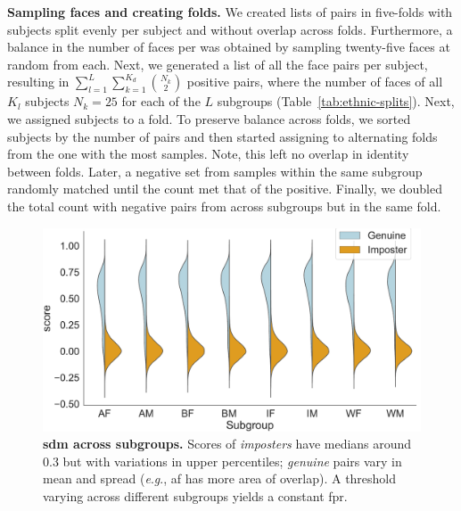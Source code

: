 \documentclass[10pt,twocolumn,letterpaper]{article}
\newcommand{\eg}{\textit{e}.\textit{g}., }
\begin{document}
\vspace{1mm}
\noindent\textbf{Sampling faces and creating folds.} We created lists of pairs in five-folds with subjects split evenly per subject and without overlap across folds. Furthermore, a balance in the number of faces per was obtained by sampling twenty-five faces at random from each. Next, we generated a list of all the face pairs per subject, resulting in $\sum_{l=1}^{L}\sum_{k=1}^{K_d} {N_k \choose 2}$ positive pairs, where the number of faces of all $K_l$ subjects $N_k=25$  for each of the $L$ subgroups (Table~\ref{tab:ethnic-splits}). Next, we assigned subjects to a fold. To preserve balance across folds, we sorted subjects by the number of pairs and then started assigning to alternating folds from the one with the most samples. Note, this left no overlap in identity between folds. Later, a negative set from samples within the same subgroup randomly matched until the count met that of the positive. Finally, we doubled the total count with negative pairs from across subgroups but in the same fold.
\begin{figure}[t!] 
	\centering
	\centering
	\includegraphics[width=1\linewidth]{figures/violinplots.pdf}
		\caption{\textbf{\Gls{sdm} across subgroups.} Scores of \emph{imposters} have medians around 0.3 but with variations in upper percentiles; \emph{genuine} pairs vary in mean and spread (\eg \gls{af} has more area of overlap). A threshold varying across different subgroups yields a constant \gls{fpr}.} \label{fig:detection-model} 
\end{figure} 


\end{document}
